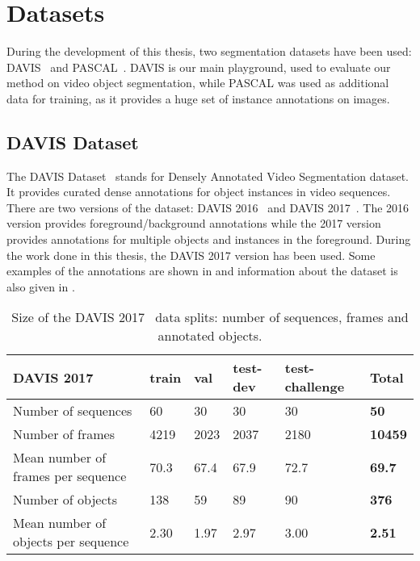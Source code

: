 \section{Datasets}

During the development of this thesis, two segmentation datasets have been used: DAVIS~\davisboth{} and PASCAL~\pascal{}.
DAVIS is our main playground, used to evaluate our method on video object segmentation, while PASCAL was used as additional data for training, as it provides a huge set of instance annotations on images.

\subsection{DAVIS Dataset}

The DAVIS Dataset~\davisboth{} stands for Densely Annotated Video Segmentation dataset.
It provides curated dense annotations for object instances in video sequences.
There are two versions of the dataset: DAVIS 2016~\davisold{} and DAVIS 2017~\davislast{}.
The 2016 version provides foreground/background annotations while the 2017 version provides annotations for multiple objects and instances in the foreground.
During the work done in this thesis, the DAVIS 2017 version has been used.
Some examples of the annotations are shown in  and information about the dataset is also given in .

\begin{table}[h]
  \centering
  \begin{tabular}{l|llll|l}
    \toprule
    DAVIS 2017                          & train & val  & test-dev & test-challenge & \textbf{Total} \\
    \midrule
    Number of sequences                 & 60    & 30   & 30       & 30             & \textbf{50}    \\
    Number of frames                    & 4219  & 2023 & 2037     & 2180           & \textbf{10459} \\
    Mean number of frames per sequence  & 70.3  & 67.4 & 67.9     & 72.7           & \textbf{69.7}  \\
    Number of objects                   & 138   & 59   & 89       & 90             & \textbf{376}   \\
    Mean number of objects per sequence & 2.30  & 1.97 & 2.97     & 3.00           & \textbf{2.51} \\
    \bottomrule
  \end{tabular}
  \caption{Size of the DAVIS 2017~\davislast{} data splits: number of sequences, frames and annotated objects.}
  \label{tab:datasets:davis}
\end{table}

